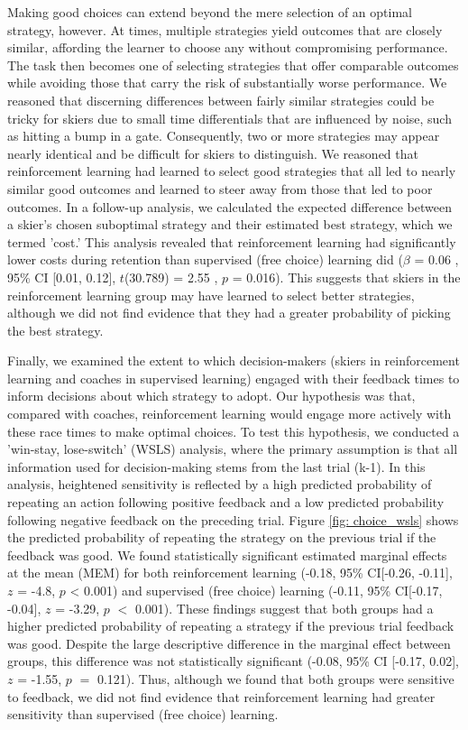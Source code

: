 \documentclass[pdflatex,sn-mathphys-num]{sn-jnl}%
\theoremstyle{thmstyleone}%
\theoremstyle{thmstyletwo}%
\theoremstyle{thmstylethree}%
\begin{document}
Making good choices can extend beyond the mere selection of an optimal strategy, however. At times, multiple strategies yield outcomes that are closely similar, affording the learner to choose any without compromising performance. The task then becomes one of selecting strategies that offer comparable outcomes while avoiding those that carry the risk of substantially worse performance. We reasoned that discerning differences between fairly similar strategies could be tricky for skiers due to small time differentials that are influenced by noise, such as hitting a bump in a gate. Consequently, two or more strategies may appear nearly identical and be difficult for skiers to distinguish. We reasoned that reinforcement learning had learned to select good strategies that all led to nearly similar good outcomes and learned to steer away from those that led to poor outcomes. In a follow-up analysis, we calculated the expected difference between a skier's chosen suboptimal strategy and their estimated best strategy, which we termed 'cost.' This analysis revealed that reinforcement learning had significantly lower costs during retention than supervised (free choice) learning did  ($\beta$ = 0.06 , 95\% CI [0.01, 0.12], $t$(30.789) = 2.55 , $p$ = 0.016). This suggests that skiers in the reinforcement learning group may have learned to select better strategies, although we did not find evidence that they had a greater probability of picking the best strategy.

Finally, we examined the extent to which decision-makers (skiers in reinforcement learning and coaches in supervised learning) engaged with their feedback times to inform decisions about which strategy to adopt. Our hypothesis was that, compared with coaches, reinforcement learning would engage more actively with these race times to make optimal choices. To test this hypothesis, we conducted a 'win-stay, lose-switch' (WSLS) analysis, where the primary assumption is that all information used for decision-making stems from the last trial (k-1). In this analysis, heightened sensitivity is reflected by a high predicted probability of repeating an action following positive feedback and a low predicted probability following negative feedback on the preceding trial. Figure \ref{fig: choice_wsls} shows the predicted probability of repeating the strategy on the previous trial if the feedback was good. We found statistically significant estimated marginal effects at the mean (MEM) for both reinforcement learning  (-0.18, 95\% CI[-0.26, -0.11], $z$ = -4.8, $p$ < 0.001) and supervised (free choice) learning (-0.11, 95\% CI[-0.17, -0.04], $z$ = -3.29, $p$ $<$ 0.001). These findings suggest that both groups had a higher predicted probability of repeating a strategy if the previous trial feedback was good. Despite the large descriptive difference in the marginal effect between groups, this difference was not statistically  significant (-0.08, 95\% CI [-0.17, 0.02], $z$ = -1.55, $p$ $=$ 0.121). Thus, although we found that both groups were sensitive to feedback, we did not find evidence that reinforcement learning had greater sensitivity than supervised (free choice) learning. 
\end{document}
